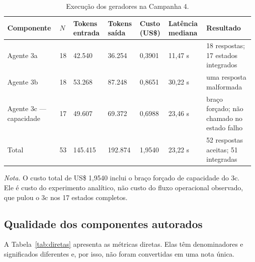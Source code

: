 \documentclass[11pt,a4paper]{article}
\begin{document}
\begin{table}[H]
\centering
\caption{Execução dos geradores na Campanha 4.}
\label{tab:execucao}
\footnotesize
\setlength{\tabcolsep}{2pt}
\begin{tabularx}{\textwidth}{@{}P{1.85cm}R{1.0cm}R{1.4cm}R{1.4cm}R{1.35cm}R{1.45cm}Y@{}}
\toprule
Componente & $N$ & Tokens entrada & Tokens saída & Custo (US\$) & Latência mediana & Resultado \\
\midrule
Agente 3a & 18 & 42.540 & 36.254 & 0,3901 & 11,47 s & 18 respostas; 17 estados integrados \\
Agente 3b & 18 & 53.268 & 87.248 & 0,8651 & 30,22 s & uma resposta malformada \\
Agente 3c --- capacidade & 17 & 49.607 & 69.372 & 0,6988 & 23,46 s & braço forçado; não chamado no estado falho \\
\midrule
Total & 53 & 145.415 & 192.874 & 1,9540 & 23,22 s & 52 respostas aceitas; 51 integradas \\
\bottomrule
\end{tabularx}
\begin{minipage}{\textwidth}\scriptsize\emph{Nota.} O custo total de US\$ 1,9540 inclui o braço forçado de capacidade do 3c. Ele é custo do experimento analítico, não custo do fluxo operacional observado, que pulou o 3c nos 17 estados completos.\end{minipage}
\end{table}

\subsection{Qualidade dos componentes autorados}

A Tabela~\ref{tab:diretas} apresenta as métricas diretas. Elas têm denominadores e significados diferentes e, por isso, não foram convertidas em uma nota única.
\end{document}
